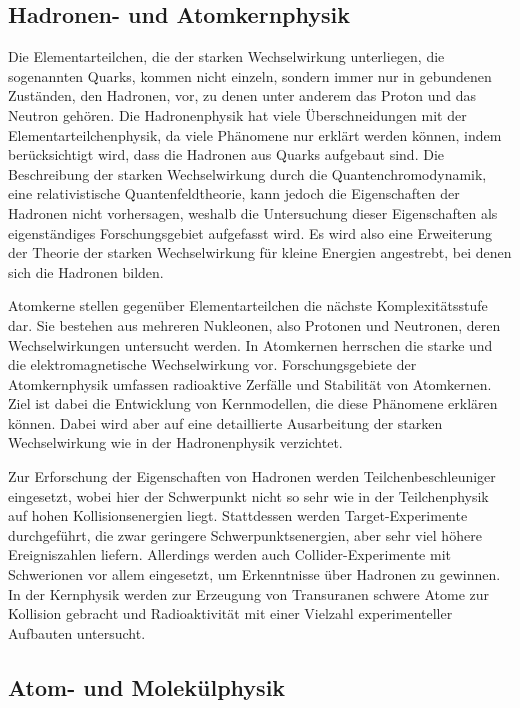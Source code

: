 \documentclass[titlepage, parkskip=full, twocolumn, landscape]{scrartcl}
\begin{document}
\subsection{Hadronen- und Atomkernphysik}

Die Elementarteilchen, die der starken Wechselwirkung unterliegen, die sogenannten Quarks, kommen nicht einzeln, sondern immer nur in gebundenen Zuständen, den Hadronen, vor, zu denen unter anderem das Proton und das Neutron gehören. Die Hadronenphysik hat viele Überschneidungen mit der Elementarteilchenphysik, da viele Phänomene nur erklärt werden können, indem berücksichtigt wird, dass die Hadronen aus Quarks aufgebaut sind. Die Beschreibung der starken Wechselwirkung durch die Quantenchromodynamik, eine relativistische Quantenfeldtheorie, kann jedoch die Eigenschaften der Hadronen nicht vorhersagen, weshalb die Untersuchung dieser Eigenschaften als eigenständiges Forschungsgebiet aufgefasst wird. Es wird also eine Erweiterung der Theorie der starken Wechselwirkung für kleine Energien angestrebt, bei denen sich die Hadronen bilden.

Atomkerne stellen gegenüber Elementarteilchen die nächste Komplexitätsstufe dar. Sie bestehen aus mehreren Nukleonen, also Protonen und Neutronen, deren Wechselwirkungen untersucht werden. In Atomkernen herrschen die starke und die elektromagnetische Wechselwirkung vor. Forschungsgebiete der Atomkernphysik umfassen radioaktive Zerfälle und Stabilität von Atomkernen. Ziel ist dabei die Entwicklung von Kernmodellen, die diese Phänomene erklären können. Dabei wird aber auf eine detaillierte Ausarbeitung der starken Wechselwirkung wie in der Hadronenphysik verzichtet.

Zur Erforschung der Eigenschaften von Hadronen werden Teilchenbeschleuniger eingesetzt, wobei hier der Schwerpunkt nicht so sehr wie in der Teilchenphysik auf hohen Kollisionsenergien liegt. Stattdessen werden Target-Experimente durchgeführt, die zwar geringere Schwerpunktsenergien, aber sehr viel höhere Ereigniszahlen liefern. Allerdings werden auch Collider-Experimente mit Schwerionen vor allem eingesetzt, um Erkenntnisse über Hadronen zu gewinnen. In der Kernphysik werden zur Erzeugung von Transuranen schwere Atome zur Kollision gebracht und Radioaktivität mit einer Vielzahl experimenteller Aufbauten untersucht.

\subsection{Atom- und Molekülphysik}
\end{document}
